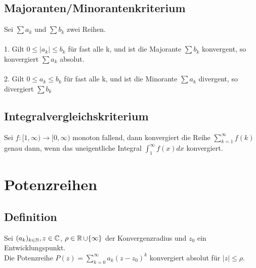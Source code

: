 \documentclass[german]{latex4ei/latex4ei_sheet}
\begin{document}
\begin{sectionbox}
	\subsection{Majoranten/Minorantenkriterium}
	Sei $\sum a_k$  und $\sum b_k$ zwei Reihen.\\
	\\1. Gilt $0 \le |a_k| \le b_k$ für fast alle k, und ist die Majorante $\sum  b_k$ konvergent, so konvergiert $\sum  a_k$ absolut. \\
    \\2. Gilt $0 \le a_k \le b_k$ für fast alle k, und ist die Minorante $\sum  a_k$ divergent, so divergiert $\sum  b_k$ 
	

\end{sectionbox}
\begin{sectionbox}
	\subsection{Integralvergleichskriterium}
	
	Sei $f:[1, \infty) \rightarrow [0,\infty)$ monoton fallend, dann konvergiert die Reihe $\sum \limits_{k=1}^{\infty} f(k)$ genau dann, wenn das uneigentliche Integral $\int_{1}^{\infty}f(x)dx$ konvergiert.
\end{sectionbox}


\section{Potenzreihen}

\begin{sectionbox}
	\subsection{Definition}
	Sei $(a_k)_{k \in \operatorname{\mathbb N}},z \in \mathbb C$,  $\rho \in \operatorname{\mathbb R} \cup \{\infty\} $ der Konvergenzradius und $z_0$ ein Entwicklungspunkt.\\
	Die Potenzreihe $P(z)=\sum \limits_{k=0}^{\infty} a_k(z-z_0)^k$ konvergiert absolut für $|z| \le \rho$.
\end{sectionbox}
\end{document}
